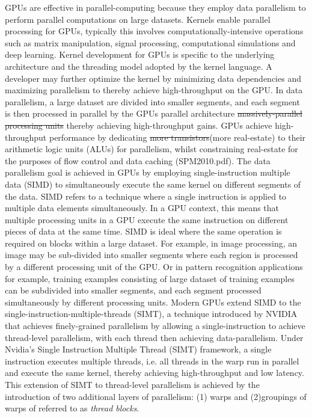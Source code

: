 \documentclass[10pt]{article}[draft]
\begin{document}
GPUs are effective in parallel-computing because they employ data parallelism to perform parallel computations on large datasets. Kernels enable parallel processing for GPUs, typically this involves computationally-intensive operations such as matrix manipulation, signal processing, computational simulations and deep learning. Kernel development for GPUs is specific to the underlying architecture and the threading model adopted by the kernel language. A developer may further optimize the kernel by minimizing data dependencies and maximizing parallelism  to thereby achieve high-throughput on the GPU. In data parallelism, a large dataset are divided into smaller segments, and each segment is  then processed in parallel by the GPUs parallel architecture \st{massively-parallel processing units} thereby achieving high-throughput gains. GPUs achieve high-throughput  performance by dedicating \st{more transistors}(more real-estate) to their arithmetic logic units (ALUs) for parallelism, whilst constraining real-estate for the purposes of flow control and data caching (SPM2010.pdf). The data parallelism goal is achieved in GPUs by employing single-instruction multiple data (SIMD) to simultaneously execute the same kernel on different segments of the data. SIMD refers to a technique where a single instruction is applied to multiple data elements simultaneously. In a GPU context, this means that multiple processing units in a GPU execute the same instruction on different pieces of data at the same time. SIMD is ideal where the same operation is required on blocks within a large dataset. For example, in image processing, an image may be sub-divided into smaller segments where each region is  processed by a different processing unit of the GPU. Or in pattern recognition applications for example, training examples consisting of large dataset of training examples can be subdivided into smaller segments, and each segment  processed simultaneously by different processing units. Modern GPUs extend SIMD to the single-instruction-multiple-threads (SIMT), a technique introduced by NVIDIA that achieves finely-grained parallelism by allowing a single-instruction to achieve thread-level parallelism, with each thread then achieving data-parallelism.  Under Nvidia's Single Instruction Multiple Thread (SIMT) framework, a single instruction executes multiple threads, i.e. all threads in  the warp  run in parallel and execute the same kernel, thereby achieving high-throughput and low latency. This extension of SIMT to thread-level parallelism is achieved by the introduction of two additional layers of parallelism: (1) warps and (2)groupings of warps of referred to as \emph{thread blocks}.
\end{document}
